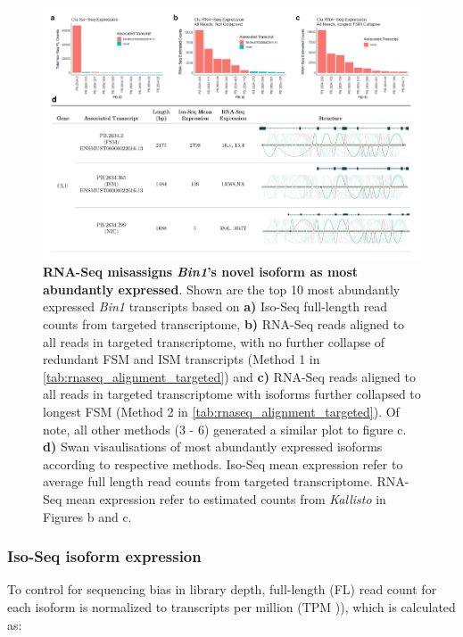 \begin{landscape}
	
	\begin{figure}[htp]
		\centering
		\includegraphics[page=2,trim={0cm 0cm 0cm 0cm},clip,scale = 0.8]{Figures/ProjectDevelopment_Figures_Landscape.pdf}
		\captionsetup{width=1.2\textwidth,singlelinecheck=off}
		\caption[RNA-Seq misassignment of dominant isoform associated with \textit{Bin1}]%
		{\textbf{RNA-Seq misassigns \textit{Bin1}'s novel isoform as most abundantly expressed}. Shown are the top 10 most abundantly expressed \textit{Bin1} transcripts based on \textbf{a)} Iso-Seq full-length read counts from targeted transcriptome, \textbf{b)} RNA-Seq reads aligned to all reads in targeted transcriptome, with no further collapse of redundant FSM and ISM transcripts (Method 1 in \cref{tab:rnaseq_alignment_targeted}) and \textbf{c)} RNA-Seq reads aligned to all reads in targeted transcriptome with isoforms further collapsed to longest FSM (Method 2 in \cref{tab:rnaseq_alignment_targeted}). Of note, all other methods (3 - 6) generated a similar plot to figure c. \textbf{d)} Swan visaulisations of most abundantly expressed isoforms according to respective methods. Iso-Seq mean expression refer to average full length read counts from targeted transcriptome. RNA-Seq mean expression refer to estimated counts from \textit{Kallisto} in Figures b and c. 
		}
		\label{fig:Bin1_TargetedRNAseqAlignment}
	\end{figure}
\end{landscape}
\restoregeometry

\subsubsection{Iso-Seq isoform expression}
To control for sequencing bias in library depth, full-length (FL) read count for each isoform is normalized to transcripts per million (TPM )), which is calculated as: 


